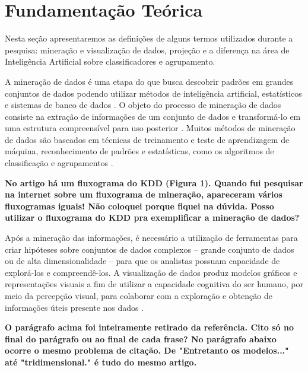 	\section{Fundamentação Teórica}
	\label{sec:FundTeor}
		Nesta seção apresentaremos as definições de alguns termos utilizados
		durante a pesquisa: mineração e visualização de dados, projeção e a diferença
		na área de Inteligência Artificial sobre classificadores e agrupamento.
		
		A mineração de dados é uma etapa do 
		\cite{fayyad1996} que busca descobrir padrões em grandes conjuntos de dados
		podendo utilizar métodos de inteligência artificial, estatísticos e sistemas
		de banco de dados \cite{chakrabarti2006}. O objeto do processo de mineração
		de dados consiste na extração de informações de um conjunto de dados e
		transformá-lo em uma estrutura compreensível para uso posterior \cite{chakrabarti2006}.
		Muitos métodos de mineração de dados são baseados em técnicas de treinamento
		e teste de aprendizagem de máquina, reconhecimento de padrões e estatísticas,
		como os algoritmos de classificação e agrupamentos \cite{fayyad1996}.
		
		\textbf{No artigo \cite{fayyad1996} há um fluxograma do KDD (Figura 1).
		Quando fui pesquisar na internet sobre um fluxograma de mineração, apareceram
		vários fluxogramas iguais! Não coloquei porque fiquei na dúvida. Posso utilizar
		o fluxograma do KDD pra exemplificar a mineração de dados?}
		
		Após a mineração das informações, é necessário a utilização de ferramentas
		para criar hipóteses sobre conjuntos de dados complexos -- grande conjunto
		de dados ou de alta dimensionalidade -- para que os analistas possuam
		capacidade de explorá-los e compreendê-los. A visualização de dados produz
		modelos gráficos e representações visuais a fim de utilizar a capacidade
		cognitiva do ser humano, por meio da percepção visual, para colaborar com
		a exploração e obtenção de informações úteis presente nos dados \cite{de2003}.
		
		\textbf{O parágrafo acima foi inteiramente retirado da referência. Cito só
			no final do parágrafo ou ao final de cada frase? No parágrafo abaixo
			ocorre o mesmo problema de citação. De "Entretanto os modelos..."
			até "tridimensional." é tudo do mesmo artigo.}
		 
